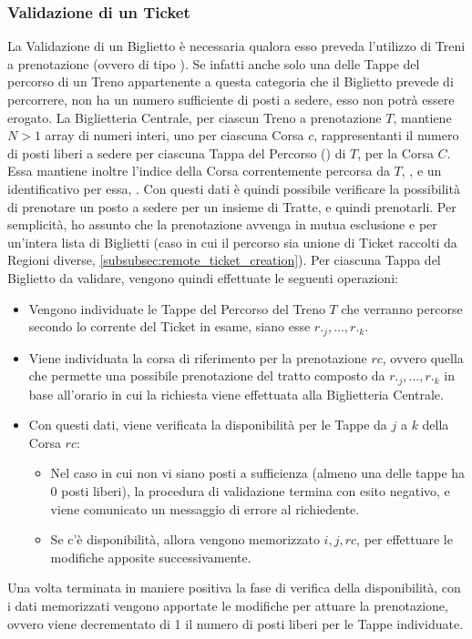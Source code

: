 	\subsubsection {Validazione di un Ticket}\label{subsubsec:validation}
	
	La Validazione di un Biglietto è necessaria qualora esso preveda l'utilizzo di Treni a prenotazione (ovvero di tipo ). Se infatti anche solo una delle Tappe del percorso di un Treno appartenente a questa categoria che il Biglietto prevede di percorrere, non ha un numero sufficiente di posti a sedere, esso non potrà essere erogato. 
	La Biglietteria Centrale, per ciascun Treno a prenotazione $T$, mantiene $N>1$ array di numeri interi, uno per ciascuna Corsa $c$, rappresentanti il numero di posti liberi a sedere per ciascuna Tappa del Percorso () di $T$, per la Corsa $C$. Essa mantiene inoltre l'indice della Corsa correntemente percorsa da $T$, , e un identificativo per essa, . Con questi dati è quindi possibile verificare la possibilità di prenotare un posto a sedere per un insieme di Tratte, e quindi prenotarli. Per semplicità, ho assunto che la prenotazione avvenga in mutua esclusione e per un'intera lista di Biglietti (caso in cui il percorso sia unione di Ticket raccolti da Regioni diverse, \ref{subsubsec:remote_ticket_creation}). 
	Per ciascuna Tappa del Biglietto da validare, vengono quindi effettuate le seguenti operazioni:
	\begin{itemize}
		\item Vengono individuate le Tappe del Percorso del Treno $T$ che verranno percorse secondo lo  corrente del Ticket in esame, siano esse $r._j,...,r._k$. 
		\item Viene individuata la corsa di riferimento per la prenotazione $rc$, ovvero quella che permette una possibile prenotazione del tratto composto da $r._j,...,r._k$ in base all'orario in cui la richiesta viene effettuata alla Biglietteria Centrale.  
		\item Con questi dati, viene verificata la disponibilità per le Tappe da $j$ a $k$ della Corsa $rc$:
			\begin{itemize}
				\item Nel caso in cui non vi siano posti a sufficienza (almeno una delle tappe ha 0 posti liberi), la procedura di validazione termina con esito negativo, e viene comunicato un messaggio di errore al richiedente.
				\item Se c'è disponibilità, allora vengono memorizzato $i,j,rc$, per effettuare le modifiche apposite successivamente. 
			\end{itemize}
	\end{itemize} 
	Una volta terminata in maniere positiva la fase di verifica della disponibilità, con i dati memorizzati vengono apportate le modifiche per attuare la prenotazione, ovvero viene decrementato di 1 il numero di posti liberi per le Tappe individuate.
	

